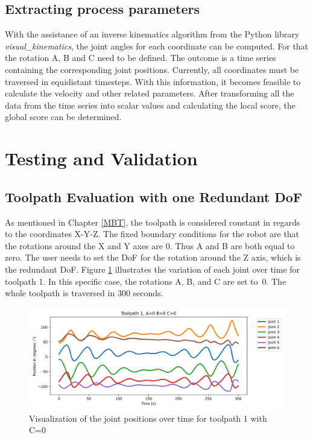 \subsection{Extracting process parameters}
With the assistance of an inverse kinematics algorithm from the Python library \textit{visual\_kinematics}, the joint angles for each coordinate can be computed. For that the rotation A, B and C need to be defined. The outcome is a time series containing the corresponding joint positions. Currently, all coordinates must be traversed in equidistant timesteps. With this information, it becomes feasible to calculate the velocity and other related parameters. After transforming all the data from the time series into scalar values and calculating the local score, the global score can be determined.
\newpage
\section{Testing and Validation}%

\subsection{Toolpath Evaluation with one Redundant DoF}
As mentioned in Chapter \ref{MBT}, the toolpath is considered constant in regards to the coordinates X-Y-Z. The fixed boundary conditions for the robot are that the rotations around the X and Y axes are 0. Thus A and B are both equal to zero. The user needs to set the DoF for the rotation around the Z axis, which is the redundant DoF. Figure \ref{TP1ABC0} illustrates the variation of each joint over time for toolpath 1. In this specific case, the rotations A, B, and C are set to~0. The whole toolpath is traversed in 300 seconds. 

\begin{figure}[H]
	\centerline{\includegraphics[width=1\textwidth]{figures/TP1ABC0.png}}
	\caption{Visualization of the joint positions over time for toolpath 1 with C=0}
	\label{TP1ABC0}
\end{figure}

